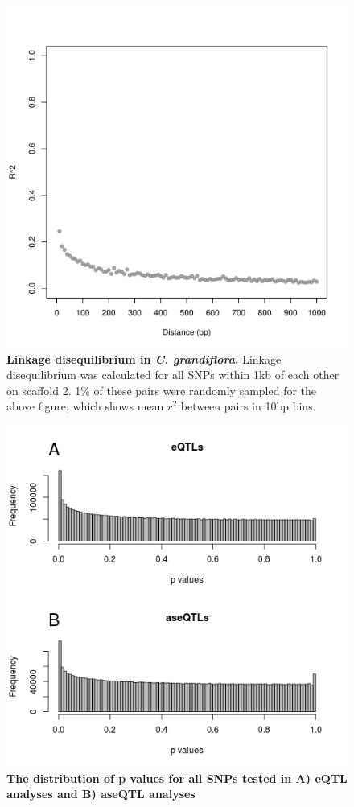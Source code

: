 \begin{figure}[ht]
      \centering
       \includegraphics[width=\linewidth]{Ch3FigS1}
    \caption{\textbf{Linkage disequilibrium in \textit{C. grandiflora}.} Linkage disequilibrium was calculated for all SNPs within 1kb of each other on scaffold 2. 1\% of these pairs were randomly sampled for the above figure, which shows mean $r{^2}$ between pairs in 10bp bins.}
    \label{fig:3figS1}
\end{figure}

\begin{figure}[ht]
      \centering
       \includegraphics[width=\linewidth]{Ch3FigS2}
    \caption{\textbf{The distribution of p values for all SNPs tested in A) eQTL analyses and B) aseQTL analyses}}
    \label{fig:3figS2}
\end{figure}


